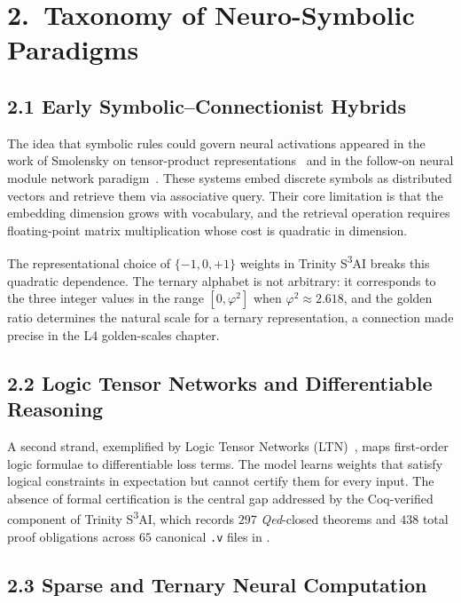 \section{2.\ Taxonomy of Neuro-Symbolic Paradigms}
\label{sec:gc-taxonomy}

\subsection{2.1 Early Symbolic--Connectionist Hybrids}
\label{subsec:gc-early}

The idea that symbolic rules could govern neural
activations appeared in the work of Smolensky on
tensor-product representations~\cite{smolensky1990}
and in the follow-on neural module network
paradigm~\cite{andreas2016}.
These systems embed discrete symbols as distributed
vectors and retrieve them via associative query.
Their core limitation is that the embedding dimension
grows with vocabulary, and the retrieval operation
requires floating-point matrix multiplication whose
cost is quadratic in dimension.

The representational choice of $\{-1,0,+1\}$ weights
in Trinity S\textsuperscript{3}AI breaks this quadratic
dependence.
The ternary alphabet is not arbitrary: it corresponds
to the three integer values in the range
$[0, \varphi^2]$ when $\varphi^2 \approx 2.618$, and the
golden ratio determines the natural scale for a
ternary representation, a connection made precise in
the L4 golden-scales chapter.

\subsection{2.2 Logic Tensor Networks and
Differentiable Reasoning}
\label{subsec:gc-ltn}

A second strand, exemplified by Logic Tensor
Networks (LTN)~\cite{serafini2016},
maps first-order logic formulae to differentiable
loss terms.
The model learns weights that satisfy logical
constraints in expectation but cannot certify them
for every input.
The absence of formal certification is the central
gap addressed by the Coq-verified component of
Trinity S\textsuperscript{3}AI, which records
$297$ \emph{Qed}-closed theorems and $438$ total
proof obligations across $65$ canonical \texttt{.v}
files in .

\subsection{2.3 Sparse and Ternary Neural Computation}
\label{subsec:gc-sparse}

